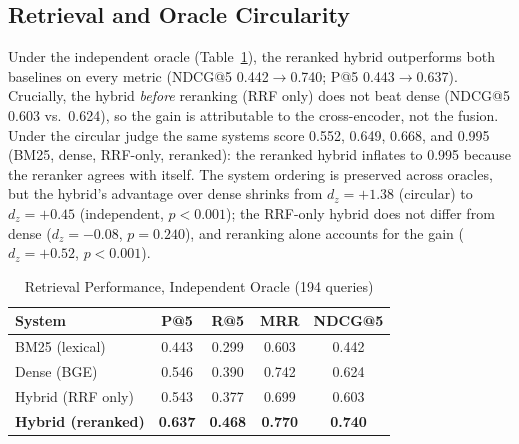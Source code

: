 \documentclass[conference]{IEEEtran}
\begin{document}
\subsection{Retrieval and Oracle Circularity}
Under the independent oracle (Table~\ref{tab:retrieval}), the reranked hybrid outperforms both baselines on every metric (NDCG@5 0.442$\rightarrow$0.740; P@5 0.443$\rightarrow$0.637). Crucially, the hybrid \emph{before} reranking (RRF only) does not beat dense (NDCG@5 0.603 vs.\ 0.624), so the gain is attributable to the cross-encoder, not the fusion. Under the circular judge the same systems score 0.552, 0.649, 0.668, and 0.995 (BM25, dense, RRF-only, reranked): the reranked hybrid inflates to 0.995 because the reranker agrees with itself. The system ordering is preserved across oracles, but the hybrid's advantage over dense shrinks from $d_z=+1.38$ (circular) to $d_z=+0.45$ (independent, $p<0.001$); the RRF-only hybrid does not differ from dense ($d_z=-0.08$, $p=0.240$), and reranking alone accounts for the gain ($d_z=+0.52$, $p<0.001$).
\begin{table}[htbp]
\caption{Retrieval Performance, Independent Oracle (194 queries)}
\begin{center}
\begin{tabular}{lcccc}
\toprule
\textbf{System} & \textbf{P@5} & \textbf{R@5} & \textbf{MRR} & \textbf{NDCG@5} \\
\midrule
BM25 (lexical) & 0.443 & 0.299 & 0.603 & 0.442 \\
Dense (BGE) & 0.546 & 0.390 & 0.742 & 0.624 \\
Hybrid (RRF only) & 0.543 & 0.377 & 0.699 & 0.603 \\
\textbf{Hybrid (reranked)} & \textbf{0.637} & \textbf{0.468} & \textbf{0.770} & \textbf{0.740} \\
\bottomrule
\end{tabular}
\label{tab:retrieval}
\end{center}
\end{table}
\end{document}
